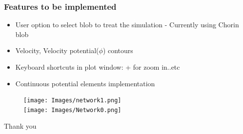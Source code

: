 \documentclass{beamer}
\begin{document}
\begin{frame}
	\frametitle{Features to be implemented}
	\begin{itemize}
		\item User option to select \alert{blob} to treat the simulation - Currently using \alert{Chorin} blob
			\pause
		\item Velocity, Velocity potential($\phi$) contours
			\pause
		\item Keyboard shortcuts in plot window: \alert{+} for zoom in..etc
			\pause
		\item Continuous potential elements implementation
	\end{itemize}
\end{frame}
\begin{frame}
	\begin{figure}
		\centering
		\texttt{[image: Images/network1.png]}\\
		\texttt{[image: Images/Network0.png]}
	\end{figure}
\end{frame}

\begin{frame}
	\begin{center}
		\Huge{Thank you}
	\end{center}
\end{frame}
\end{document}
